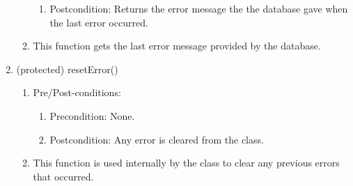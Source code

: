 \documentclass{article}
\begin{document}
\begin{enumerate}
\begin{enumerate}
\begin{enumerate}
\item Postcondition: Returns the error message the the database gave when the last error occurred.
\end{enumerate}
\item This function gets the last error message provided by the database.
\end{enumerate}
\item (protected) resetError()
\begin{enumerate}
\item Pre/Post-conditions:
\begin{enumerate}
\item Precondition: None.
\item Postcondition: Any error is cleared from the class.
\end{enumerate}
\item This function is used internally by the class to clear any previous errors that occurred.
\end{enumerate}
\end{enumerate}
\end{document}

